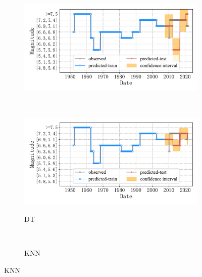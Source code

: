 \begin{figure}[!htbp]
\begin{subfigure}[b]{0.45\textwidth}
    \vspace{-0.2cm}
    \includegraphics[width=\textwidth]{Img/chap5_seism/future10_class/seism_gbr_minyear_1932_maxyear_2021_spanlat_2_spanlon_4_timewindow_120_nextmonth_120_minmag_3.0_split_ratio_0.8_blocks1_class.pdf}
    \vspace{-1cm}
    \label{fig:seism_gbr_minyear_1932_maxyear_2021_spanlat_2_spanlon_4_timewindow_120_nextmonth_120_minmag_3.0_split_ratio_0.8_blocks1_class}
  \end{subfigure}
  ~
  \begin{subfigure}[b]{0.45\textwidth}
    \caption{DT}
    \vspace{-0.2cm}
    \includegraphics[width=\textwidth]{Img/chap5_seism/future10_class/seism_dt_minyear_1932_maxyear_2021_spanlat_2_spanlon_4_timewindow_120_nextmonth_120_minmag_3.0_split_ratio_0.8_blocks1_class.pdf}
    \vspace{-1cm}
    \label{fig:seism_dt_minyear_1932_maxyear_2021_spanlat_2_spanlon_4_timewindow_120_nextmonth_120_minmag_3.0_split_ratio_0.8_blocks1_class}
  \end{subfigure}
  \\
  \begin{subfigure}[b]{0.45\textwidth}
    \caption{KNN}
    \vspace{-0.2cm}

\end{subfigure}
\end{figure}
